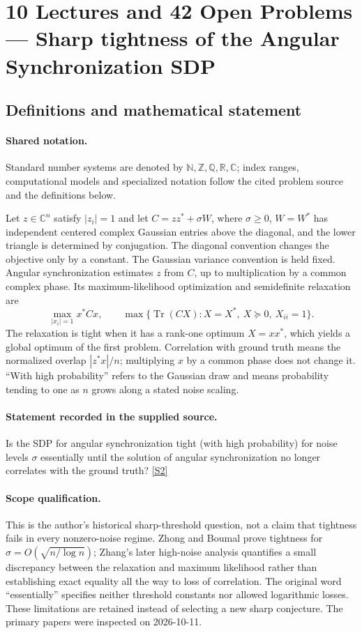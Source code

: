 \documentclass[11pt]{article}
\newcommand{\sref}[2]{\hyperlink{source:#1:#2}{[S#2]}}
\begin{document}
\section{10 Lectures and 42 Open Problems — Sharp tightness of the Angular Synchronization SDP}\label{statement}

\subsection{Definitions and mathematical statement}

\paragraph{Shared notation.}Standard number systems are denoted by $\mathbb N,\mathbb Z,\mathbb Q,\mathbb R,\mathbb C$; index ranges, computational models and specialized notation follow the cited problem source and the definitions below.


Let $z\in\mathbb{C}^n$ satisfy $|z_i|=1$ and let $C=zz^*+\sigma W$, where $\sigma\ge0$, $W=W^*$ has independent centered complex Gaussian entries above the diagonal, and the lower triangle is determined by conjugation. The diagonal convention changes the objective only by a constant. The Gaussian variance convention is held fixed. Angular synchronization estimates $z$ from $C$, up to multiplication by a common complex phase. Its maximum-likelihood optimization and semidefinite relaxation are
\[
 \max_{|x_i|=1} x^*Cx,\qquad
 \max\{\operatorname{Tr}(CX):X=X^*,\ X\succeq0,\ X_{ii}=1\}.
\]
The relaxation is tight when it has a rank-one optimum $X=xx^*$, which yields a global optimum of the first problem. Correlation with ground truth means the normalized overlap $|z^*x|/n$; multiplying $x$ by a common phase does not change it. ``With high probability'' refers to the Gaussian draw and means probability tending to one as $n$ grows along a stated noise scaling.
\paragraph{Statement recorded in the supplied source.}
Is the SDP for angular synchronization tight (with high probability) for noise levels $\sigma$ essentially until the solution of angular synchronization no longer correlates with the ground truth? \sref{statement}{2}
\paragraph{Scope qualification.}
This is the author's historical sharp-threshold question, not a claim that tightness fails in every nonzero-noise regime. Zhong and Boumal prove tightness for $\sigma=O(\sqrt{n/\log n})$; Zhang's later high-noise analysis quantifies a small discrepancy between the relaxation and maximum likelihood rather than establishing exact equality all the way to loss of correlation. The original word ``essentially'' specifies neither threshold constants nor allowed logarithmic losses. These limitations are retained instead of selecting a new sharp conjecture. The primary papers were inspected on 2026-10-11.
\end{document}
